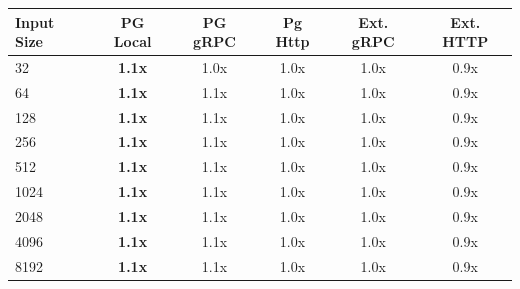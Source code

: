 \begin{tabular}{lccccc}
\toprule
\textbf{Input Size} & \textbf{PG Local} & \textbf{PG gRPC} & \textbf{Pg Http} & \textbf{Ext. gRPC} & \textbf{Ext. HTTP} \\
\midrule
32 & \textbf{1.1x} & 1.0x & 1.0x & 1.0x & 0.9x \\
64 & \textbf{1.1x} & 1.1x & 1.0x & 1.0x & 0.9x \\
128 & \textbf{1.1x} & 1.1x & 1.0x & 1.0x & 0.9x \\
256 & \textbf{1.1x} & 1.1x & 1.0x & 1.0x & 0.9x \\
512 & \textbf{1.1x} & 1.1x & 1.0x & 1.0x & 0.9x \\
1024 & \textbf{1.1x} & 1.1x & 1.0x & 1.0x & 0.9x \\
2048 & \textbf{1.1x} & 1.1x & 1.0x & 1.0x & 0.9x \\
4096 & \textbf{1.1x} & 1.1x & 1.0x & 1.0x & 0.9x \\
8192 & \textbf{1.1x} & 1.1x & 1.0x & 1.0x & 0.9x \\
\bottomrule
\end{tabular}

